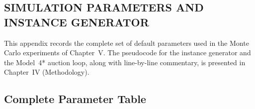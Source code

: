 \begin{appendices}

\chapter{SIMULATION PARAMETERS AND INSTANCE GENERATOR}\label{app:params}

\begin{doublespacing}

This appendix records the complete set of default parameters used in the
Monte Carlo experiments of Chapter~V. The pseudocode for the instance
generator and the Model~4* auction loop, along with line-by-line
commentary, is presented in Chapter~IV (Methodology).

\section{Complete Parameter Table}


\end{doublespacing}
\end{appendices}
